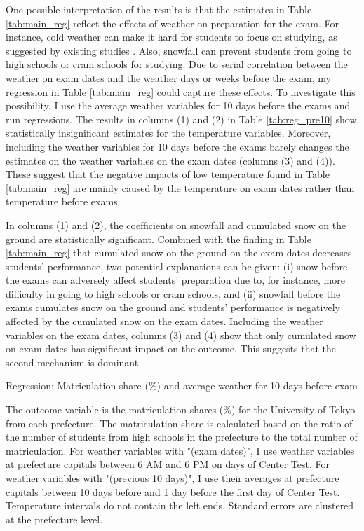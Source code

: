 \documentclass[12pt,letterpaper]{article}
\begin{document}
One possible interpretation of the results is that the estimates in Table \ref{tab:main_reg} reflect the effects of weather on preparation for the exam.
For instance, cold weather can make it hard for students to focus on studying, as suggested by existing studies \citep{Taylor2016}.
Also, snowfall can prevent students from going to high schools or cram schools for studying.
Due to serial correlation between the weather on exam dates and the weather days or weeks before the exam, my regression in Table \ref{tab:main_reg} could capture these effects.
To investigate this possibility, I use the average weather variables for 10 days before the exams and run regressions.
The results in columns (1) and (2) in Table \ref{tab:reg_pre10} show statistically insignificant estimates for the temperature variables.
Moreover, including the weather variables for 10 days before the exams barely changes the estimates on the weather variables on the exam dates (columns (3) and (4)).
These suggest that the negative impacts of low temperature found in Table \ref{tab:main_reg} are mainly caused by the temperature on exam dates rather than temperature before exams.

In columns (1) and (2), the coefficients on snowfall and cumulated snow on the ground are statistically significant.
Combined with the finding in Table \ref{tab:main_reg} that cumulated snow on the ground on the exam dates decreases students' performance, two potential explanations can be given:
(i) snow before the exams can adversely affect students' preparation due to, for instance, more difficulty in going to high schools or cram schools, and
(ii) snowfall before the exams cumulates snow on the ground and students' performance is negatively affected by the cumulated snow on the exam dates.
Including the weather variables on the exam dates, columns (3) and (4) show that only cumulated snow on exam dates has significant impact on the outcome.
This suggests that the second mechanism is dominant.

\begin{table}[H]
  \center
  \caption{Regression: Matriculation share (\%) and average weather for 10 days before exam}
  \scriptsize
  
  \label{tab:reg_pre10}
  \scriptsize
  \begin{tablenotes}
    \item
      The outcome variable is the matriculation shares (\%) for the University of Tokyo from each prefecture.
      The matriculation share is calculated based on the ratio of the number of students from high schools in the prefecture to the total number of matriculation.
      For weather variables with "(exam dates)", I use weather variables at prefecture capitals between 6 AM and 6 PM on days of Center Test.
      For weather variables with "(previous 10 days)", I use their averages at prefecture capitals between 10 days before and 1 day before the first day of Center Test.
      Temperature intervals do not contain the left ends.
      Standard errors are clustered at the prefecture level.
  \end{tablenotes}
\end{table}
\end{document}
